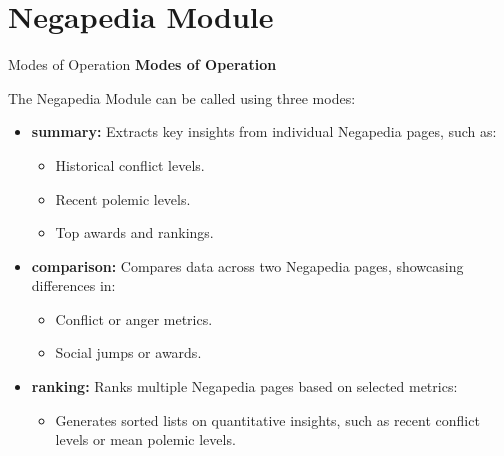 \documentclass{beamer}
\begin{document}
\section{Negapedia Module}
    \begin{frame}{Modes of Operation}
        \textbf{Modes of Operation}
        
        The Negapedia Module can be called using three modes:
            \begin{itemize}
                \item \textbf{summary:}
                    Extracts key insights from individual Negapedia pages, such as:
                    \begin{itemize}
                        \item Historical conflict levels.
                        \item Recent polemic levels.
                        \item Top awards and rankings.
                    \end{itemize}
                \item \textbf{comparison:}
                    Compares data across two Negapedia pages, showcasing differences in:
                    \begin{itemize}
                        \item Conflict or anger metrics.
                        \item Social jumps or awards.
                    \end{itemize}
                \item \textbf{ranking:}
                    Ranks multiple Negapedia pages based on selected metrics:
                    \begin{itemize}
                        \item Generates sorted lists on quantitative insights, such as recent conflict levels or mean polemic levels.
                    \end{itemize}
            \end{itemize}
    \end{frame}
\end{document}
